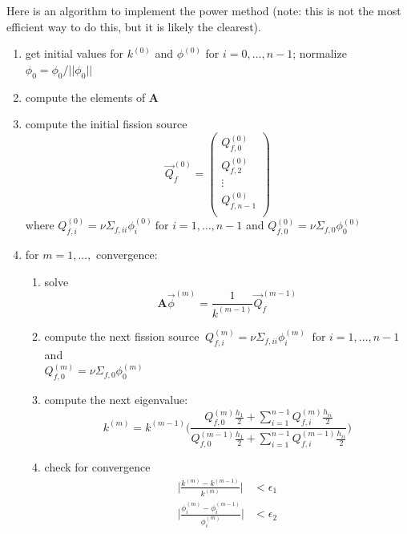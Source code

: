 \documentclass[12pt]{article}
\newcommand{\ve}[1]{\ensuremath{\mathbf{#1}}}
\begin{document}
Here is an algorithm to implement the power method (note: this is not the most efficient way to do this, but it is likely the clearest).
%
\begin{enumerate}
\item get initial values for $k^{(0)}$ and $\phi^{(0)}$ for $i = 0, \dots, n-1$; normalize $\phi_0 = \phi_0 / ||\phi_0||$

\item compute the elements of $\ve{A}$

\item compute the initial fission source
\[\vec{Q}_{f}^{(0)} = \begin{pmatrix}
Q_{f,0}^{(0)} \\ Q_{f,2}^{(0)} \\ \vdots \\ Q_{f,n-1}^{(0)} \\
\end{pmatrix}\]
%
where $Q_{f,i}^{(0)} = \nu\Sigma_{f,ii}\phi_i^{(0)} \: \text{for } i = 1, \dots, n-1$ and $Q_{f,0}^{(0)} = \nu\Sigma_{f,0}\phi_0^{(0)}$

\item for $m = 1, ...,$ convergence:
\begin{enumerate}
\item solve
\[\ve{A} \vec{\phi}^{(m)} = \frac{1}{k^{(m-1)}}\vec{Q}_{f}^{(m-1)}\]

\item compute the next fission source $\:Q_{f,i}^{(m)} = \nu\Sigma_{f,ii}\phi_i^{(m)} \: \text{ for } i = 1, \dots, n-1$ and\\ $Q_{f,0}^{(m)} = \nu\Sigma_{f,0}\phi_0^{(m)}$

\item compute the next eigenvalue:
\[k^{(m)} = k^{(m-1)}\Biggl(\frac{Q_{f,0}^{(m)} \frac{h_1}{2} + \sum_{i=1}^{n-1} Q_{f,i}^{(m)} \frac{h_{ii}}{2}}
{Q_{f,0}^{(m-1)} \frac{h_1}{2} + \sum_{i=1}^{n-1} Q_{f,i}^{(m-1)} \frac{h_{ii}}{2}}\Biggr)\]

\item check for convergence
\begin{align}
\bigg|\frac{k^{(m)} - k^{(m-1)}}{k^{(m)}}\bigg| &< \epsilon_1 \nonumber \\
\bigg|\frac{\phi_i^{(m)} - \phi_i^{(m-1)}}{\phi_i^{(m)}}\bigg| &< \epsilon_2 \nonumber
\end{align}

\end{enumerate}
\end{enumerate}

%
% 
\end{document}
